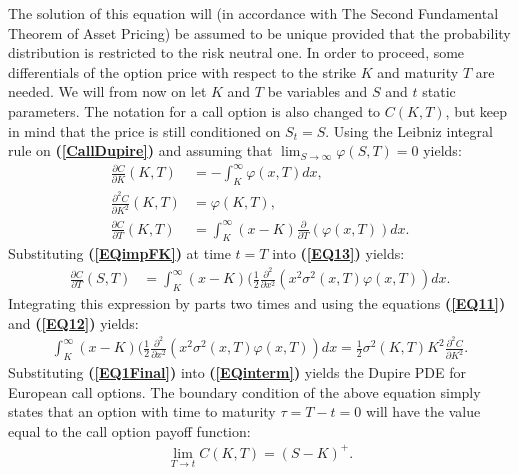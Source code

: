 \documentclass[a4paper, 12pt]{article}
\numberwithin{equation}{subsection}
\begin{document}
The solution of this equation will (in accordance with The Second Fundamental Theorem of Asset Pricing) be assumed to be unique provided that the probability distribution is restricted to the risk neutral one. In order to proceed, some differentials of the option price with respect to the strike $K$ and maturity $T$ are needed. We will from now on let $K$ and $T$ be variables and $S$ and $t$ static parameters. The notation for a call option is also changed to $C(K, T)$, but keep in mind that the price is still conditioned on $S_t = S$. Using the Leibniz integral rule on \textbf{(\ref{CallDupire})} and assuming that $\lim_{S \to \infty} \varphi(S,T) = 0$ yields:
\begin{align}
	 \frac{\partial C}{\partial K} (K,T) &= - \int_K^\infty \varphi(x,T)dx, \label{EQ11}\\
     \frac{\partial ^2 C}{\partial K^2}(K,T) &= \varphi(K,T),\label{EQ12}\\
     \frac{\partial C}{\partial T}(K,T) &= \int_K^\infty (x - K) \frac{\partial}{\partial T}(\varphi(x,T))dx. \label{EQ13}
\end{align}
Substituting \textbf{(\ref{EQimpFK})} at time $t = T$ into \textbf{(\ref{EQ13})} yields:
\begin{align}\label{EQinterm}
	 \frac{\partial C}{\partial T}(S,T) &= \int_K^\infty (x - K)(\frac{1}{2}\frac{\partial ^2}{\partial x^2}(x^2\sigma^2(x,T)\varphi(x,T))dx.
\end{align}
Integrating this expression by parts two times and using the equations \textbf{(\ref{EQ11})} and \textbf{(\ref{EQ12})} yields:
\begin{align}\label{EQ1Final}
	 \int_K^\infty (x - K)(\frac{1}{2}\frac{\partial ^2}{\partial x^2}(x^2\sigma^2(x,T)\varphi(x,T))dx = \frac{1}{2}\sigma ^ 2 (K,T)K^2 \frac{\partial^2 C}{\partial K^2}.
\end{align}
Substituting \textbf{(\ref{EQ1Final})} into \textbf{(\ref{EQinterm})} yields the Dupire PDE for European call options. The boundary condition of the above equation simply states that an
option with time to maturity $\tau = T -t = 0$ will have the value equal to the call
option payoff function:
\begin{align}
	\lim_{T \to t}C(K,T) = (S-K)^+.
\end{align}

\pagebreak
\end{document}
